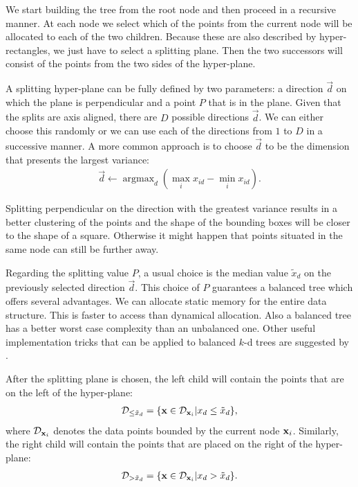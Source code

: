 We start building the tree from the root node and then proceed in a recursive manner. At each
node we select which of the points from the current node will be allocated to each of
the two children. Because these are also described by hyper-rectangles, we just have to select a splitting plane. Then the two successors will consist of the points from the two sides of the hyper-plane. 

A splitting hyper-plane can be fully defined by two parameters: a direction $\vec{d}$ on which the plane is perpendicular and a point $P$  that is in the plane. Given that the splits are axis aligned, there are $D$ possible directions $\vec{d}$. We can either choose this randomly or we can use
each of the directions from $1$ to $D$ in a successive manner. A more common approach is to choose $\vec{d}$ to be the dimension that presents the largest
variance: 
\begin{align}
	\vec{d} \leftarrow \operatorname{argmax}_{d} (\max_ix_{id} -
\min_ix_{id}).
	\label{eq:splitting-direction}
\end{align}

Splitting perpendicular on the direction with the greatest variance results in a better clustering of the points and the shape of the bounding boxes will be closer to the shape of a square. Otherwise it might happen that points situated in the same node can still be further away.

Regarding the splitting value $P$, a usual choice is the median value $\tilde{x}_d$ on the previously selected direction $\vec{d}$. This choice of $P$ guarantees a balanced tree which offers several advantages. We can allocate static memory for the entire data structure. This is faster to access than dynamical allocation. Also a balanced tree has a better worst case complexity than an unbalanced one. Other useful implementation tricks that can be applied to balanced $k$-d trees are suggested by \cite{lang2009}.

After the splitting plane is chosen, the left child will contain the points that are on the left of the hyper-plane: 
\begin{align}
\mathcal{D}_{\le \tilde{x}_d} = \{ \mathbf{x} \in \mathcal{D}_{\mathbf{x}_i}| x_{d} \le \tilde{x}_d \},
\label{eq:subset-left}
\end{align}
 where $\mathcal{D}_{\mathbf{x}_i}$ denotes the data points bounded by the current node $\mathbf{x}_i$. Similarly, the right child will contain the points that are placed on the right of the hyper-plane:
\begin{align}
\mathcal{D}_{> \tilde{x}_d} = \{ \mathbf{x} \in \mathcal{D}_{\mathbf{x}_i}| x_{d} > \tilde{x}_d \}.
\label{eq:subset-right}
\end{align}

